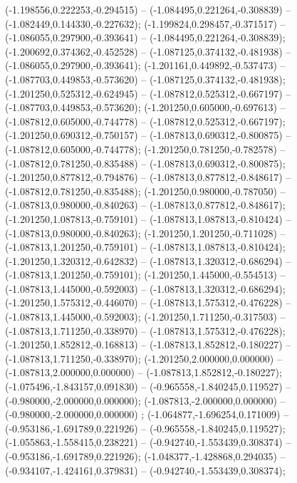  (-1.198556,0.222253,-0.294515) -- (-1.084495,0.221264,-0.308839) -- (-1.082449,0.144330,-0.227632);
 (-1.199824,0.298457,-0.371517) -- (-1.086055,0.297900,-0.393641) -- (-1.084495,0.221264,-0.308839);
 (-1.200692,0.374362,-0.452528) -- (-1.087125,0.374132,-0.481938) -- (-1.086055,0.297900,-0.393641);
 (-1.201161,0.449892,-0.537473) -- (-1.087703,0.449853,-0.573620) -- (-1.087125,0.374132,-0.481938);
 (-1.201250,0.525312,-0.624945) -- (-1.087812,0.525312,-0.667197) -- (-1.087703,0.449853,-0.573620);
 (-1.201250,0.605000,-0.697613) -- (-1.087812,0.605000,-0.744778) -- (-1.087812,0.525312,-0.667197);
 (-1.201250,0.690312,-0.750157) -- (-1.087813,0.690312,-0.800875) -- (-1.087812,0.605000,-0.744778);
 (-1.201250,0.781250,-0.782578) -- (-1.087812,0.781250,-0.835488) -- (-1.087813,0.690312,-0.800875);
 (-1.201250,0.877812,-0.794876) -- (-1.087813,0.877812,-0.848617) -- (-1.087812,0.781250,-0.835488);
 (-1.201250,0.980000,-0.787050) -- (-1.087813,0.980000,-0.840263) -- (-1.087813,0.877812,-0.848617);
 (-1.201250,1.087813,-0.759101) -- (-1.087813,1.087813,-0.810424) -- (-1.087813,0.980000,-0.840263);
 (-1.201250,1.201250,-0.711028) -- (-1.087813,1.201250,-0.759101) -- (-1.087813,1.087813,-0.810424);
 (-1.201250,1.320312,-0.642832) -- (-1.087813,1.320312,-0.686294) -- (-1.087813,1.201250,-0.759101);
 (-1.201250,1.445000,-0.554513) -- (-1.087813,1.445000,-0.592003) -- (-1.087813,1.320312,-0.686294);
 (-1.201250,1.575312,-0.446070) -- (-1.087813,1.575312,-0.476228) -- (-1.087813,1.445000,-0.592003);
 (-1.201250,1.711250,-0.317503) -- (-1.087813,1.711250,-0.338970) -- (-1.087813,1.575312,-0.476228);
 (-1.201250,1.852812,-0.168813) -- (-1.087813,1.852812,-0.180227) -- (-1.087813,1.711250,-0.338970);
 (-1.201250,2.000000,0.000000) -- (-1.087813,2.000000,0.000000) -- (-1.087813,1.852812,-0.180227);
 (-1.075496,-1.843157,0.091830) -- (-0.965558,-1.840245,0.119527) -- (-0.980000,-2.000000,0.000000);
 (-1.087813,-2.000000,0.000000) -- (-0.980000,-2.000000,0.000000) ;
 (-1.064877,-1.696254,0.171009) -- (-0.953186,-1.691789,0.221926) -- (-0.965558,-1.840245,0.119527);
 (-1.055863,-1.558415,0.238221) -- (-0.942740,-1.553439,0.308374) -- (-0.953186,-1.691789,0.221926);
 (-1.048377,-1.428868,0.294035) -- (-0.934107,-1.424161,0.379831) -- (-0.942740,-1.553439,0.308374);
